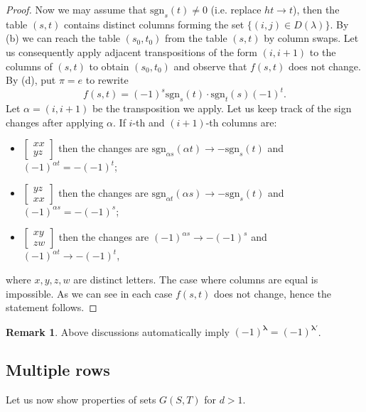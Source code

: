 \documentclass[12pt, reqno]{amsart}
\theoremstyle{definition}
\newtheorem{remark}{Remark}[section]
\newcommand{\sgn}{\mathrm{sgn}}
\begin{document}
\begin{proof}
    Now we may assume that $\sgn_s(t) \neq 0$ (i.e. replace $ht \to t$), then the table $(s,t)$ contains distinct columns forming  the set $\{(i,j)\in D(\lambda)\}$. %
    By (b) we can reach the table $(s_0,t_0)$ from the table $(s,t)$ by column swaps. Let us consequently apply adjacent transpositions of the form $(i,i+1)$ to the columns of $(s,t)$ to obtain $(s_0, t_0)$ and observe that $f(s,t)$ does not change. By (d), put $\pi = e$ to rewrite
    $$
        f(s,t) = (-1)^s \sgn_s(t) \cdot \sgn_t(s) (-1)^t.
    $$
    Let $\alpha=(i,i+1)$ be the transposition we apply. Let us keep track of the sign changes after applying $\alpha$. If $i$-th and $(i+1)$-th columns are: 
    \begin{itemize}
        \item $\begin{bmatrix}
            xx\\
            yz
        \end{bmatrix}$ then the changes are $\sgn_{\alpha s}(\alpha t) \to -\sgn_s(t)$ and $(-1)^{\alpha t} = -(-1)^t$;
        \item $\begin{bmatrix}
            yz\\
            xx
        \end{bmatrix}$ then the changes are $\sgn_{\alpha t}(\alpha s) \to -\sgn_s(t)$ and $(-1)^{\alpha s} = -(-1)^s$;
        \item $\begin{bmatrix}
            xy\\
            zw
        \end{bmatrix}$ then the changes are $(-1)^{\alpha s} \to -(-1)^s$ and $(-1)^{\alpha t} \to -(-1)^{t}$,
    \end{itemize}
    where $x,y,z,w$ are distinct letters.
    The case where columns are equal is impossible. As we can see in each case $f(s,t)$ does not change, hence the statement follows.
\end{proof}
\begin{remark}
    Above discussions automatically imply $(-1)^{\pmb{\lambda}} = (-1)^{\pmb{\lambda'}}$.
\end{remark}

\subsection{Multiple rows}
Let us now show properties of sets $G(S,T)$ for $d > 1$.
\end{document}

